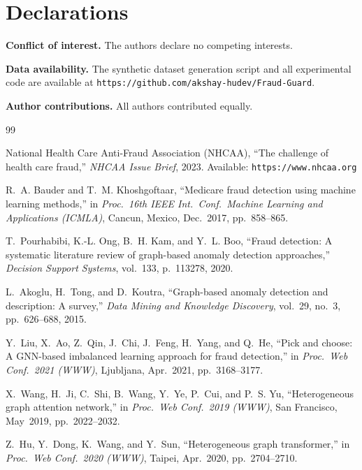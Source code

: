 \documentclass[pdflatex,sn-mathphys-num]{sn-jnl}
\theoremstyle{thmstyleone}
\theoremstyle{thmstyletwo}
\theoremstyle{thmstylethree}
\begin{document}
\begin{appendices}
\end{appendices}

\section*{Declarations}

\textbf{Conflict of interest.} The authors declare no competing interests.

\textbf{Data availability.} The synthetic dataset generation script and
all experimental code are available at
\texttt{https://github.com/akshay-hudev/Fraud-Guard}.

\textbf{Author contributions.} All authors contributed equally.

\begin{thebibliography}{99}

National Health Care Anti-Fraud Association (NHCAA),
``The challenge of health care fraud,''
\textit{NHCAA Issue Brief}, 2023.
Available: \texttt{https://www.nhcaa.org}

R.~A. Bauder and T.~M. Khoshgoftaar,
``Medicare fraud detection using machine learning methods,''
in \textit{Proc.\ 16th IEEE Int.\ Conf.\ Machine Learning and Applications
(ICMLA)}, Cancun, Mexico, Dec.\ 2017, pp.~858--865.

T.~Pourhabibi, K.-L. Ong, B.~H. Kam, and Y.~L. Boo,
``Fraud detection: A systematic literature review of graph-based anomaly
detection approaches,''
\textit{Decision Support Systems}, vol.~133, p.~113278, 2020.

L.~Akoglu, H.~Tong, and D.~Koutra,
``Graph-based anomaly detection and description: A survey,''
\textit{Data Mining and Knowledge Discovery}, vol.~29, no.~3,
pp.~626--688, 2015.

Y.~Liu, X.~Ao, Z.~Qin, J.~Chi, J.~Feng, H.~Yang, and Q.~He,
``Pick and choose: A GNN-based imbalanced learning approach for fraud detection,''
in \textit{Proc.\ Web Conf.\ 2021 (WWW)}, Ljubljana, Apr.~2021,
pp.~3168--3177.

X.~Wang, H.~Ji, C.~Shi, B.~Wang, Y.~Ye, P.~Cui, and P.~S. Yu,
``Heterogeneous graph attention network,''
in \textit{Proc.\ Web Conf.\ 2019 (WWW)}, San Francisco, May~2019,
pp.~2022--2032.

Z.~Hu, Y.~Dong, K.~Wang, and Y.~Sun,
``Heterogeneous graph transformer,''
in \textit{Proc.\ Web Conf.\ 2020 (WWW)}, Taipei, Apr.~2020,
pp.~2704--2710.


\end{thebibliography}
\end{document}

